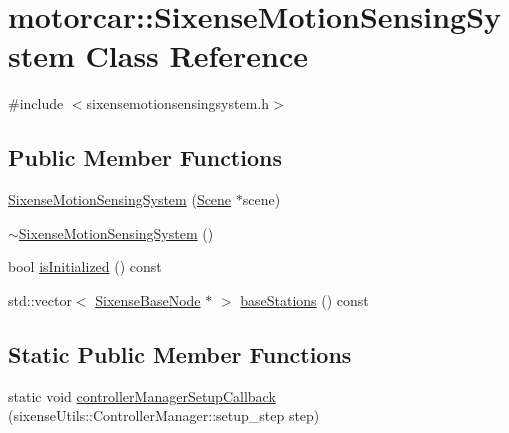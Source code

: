 \hypertarget{classmotorcar_1_1SixenseMotionSensingSystem}{\section{motorcar\-:\-:Sixense\-Motion\-Sensing\-System Class Reference}
\label{classmotorcar_1_1SixenseMotionSensingSystem}
}


{\ttfamily \#include $<$sixensemotionsensingsystem.\-h$>$}

\subsection*{Public Member Functions}
\begin{DoxyCompactItemize}
\item 
\hyperlink{classmotorcar_1_1SixenseMotionSensingSystem_a36e5d5612aabed32df976c19cfacec2d}{Sixense\-Motion\-Sensing\-System} (\hyperlink{classmotorcar_1_1Scene}{Scene} $\ast$scene)
\item 
\hyperlink{classmotorcar_1_1SixenseMotionSensingSystem_aa9d2334b2f0e2912e719e538a051f952}{$\sim$\-Sixense\-Motion\-Sensing\-System} ()
\item 
bool \hyperlink{classmotorcar_1_1SixenseMotionSensingSystem_ac58c619e72581bc1d268851f4349c07a}{is\-Initialized} () const 
\item 
std\-::vector$<$ \hyperlink{classmotorcar_1_1SixenseBaseNode}{Sixense\-Base\-Node} $\ast$ $>$ \hyperlink{classmotorcar_1_1SixenseMotionSensingSystem_ac5ed9086cca91cd68b4b038505419bd2}{base\-Stations} () const 
\end{DoxyCompactItemize}
\subsection*{Static Public Member Functions}
\begin{DoxyCompactItemize}
\item 
static void \hyperlink{classmotorcar_1_1SixenseMotionSensingSystem_a6ba2385c755b3e922d3272c9ddeb70dd}{controller\-Manager\-Setup\-Callback} (sixense\-Utils\-::\-Controller\-Manager\-::setup\-\_\-step step)
\end{DoxyCompactItemize}


